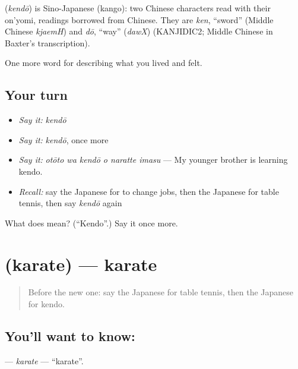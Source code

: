 \begin{cousinweb}
\textbf{} (\emph{kendō}) is Sino-Japanese (kango): two Chinese characters read with their on'yomi, readings borrowed from Chinese. They are \emph{ken}, \textquotedblleft{}sword\textquotedblright{} (Middle Chinese \emph{kjaemH}) and \emph{dō}, \textquotedblleft{}way\textquotedblright{} (\emph{dawX}) (KANJIDIC2; Middle Chinese in Baxter's transcription).
\end{cousinweb}

\begin{grammarlens}[title={What you've built}]
One more word for describing what you lived and felt.
\end{grammarlens}

\subsection*{Your turn}
\begin{itemize}
\raggedright
  \item \emph{Say it:} \emph{kendō}
  \item \emph{Say it:} \emph{kendō}, once more
  \item \emph{Say it:} \emph{otōto wa kendō o naratte imasu} — My younger brother is learning kendo.
  \item \emph{Recall:} say the Japanese for to change jobs, then the Japanese for table tennis, then say \emph{kendō} again
\end{itemize}

\begin{tcolorbox}[breakable,colback=teal!4,colframe=teal!35!black,title={Before you move on}]
What does  mean? (\textquotedblleft{}Kendo\textquotedblright{}.) Say it once more.
\end{tcolorbox}
\section[\texorpdfstring{\ja{からて} (karate)}{からて (karate)}]{ (karate) — karate}

\label{lesson:JA-C461-karate}



\begin{quote}
Before the new one: say the Japanese for table tennis, then the Japanese for kendo.
\end{quote}

\subsection*{You'll want to know: }
\textbf{} — \emph{karate} — \textquotedblleft{}karate\textquotedblright{}.

